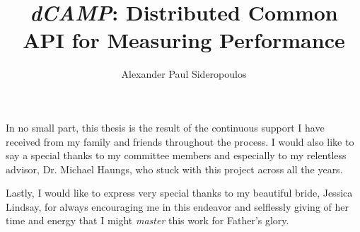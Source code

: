 \documentclass[12pt]{ucthesis}
\newcommand{\dcampns}{\emph{dCAMP}}
\begin{document}

\title{\dcampns: Distributed Common API for Measuring Performance}
\author{Alexander Paul Sideropoulos}
  
 
     

\maketitle

\begin{frontmatter}

\copyrightpage

\committeemembershippage



\begin{acknowledgements}

In no small part, this thesis is the result of the continuous support I have received from my family and friends
throughout the process. I would also like to say a special thanks to my committee members and especially to my
relentless advisor, Dr. Michael Haungs, who stuck with this project across all the years.

Lastly, I would like to express very special thanks to my beautiful bride, Jessica Lindsay, for always encouraging me in
this endeavor and selflessly giving of her time and energy that I might \textit{master} this work for Father's glory.

\end{acknowledgements}

\tableofcontents

\listoftables
\listoffigures

\end{frontmatter}

\pagestyle{plain}

\renewcommand{\baselinestretch}{1.66}










\clearpage




\appendix


\end{document}
